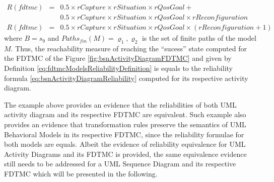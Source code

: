 \begin{equation}
\begin{aligned}
        R(fdtmc) & = & 0.5 \times rCapture \times rSituation \times rQosGoal +\\
                 &   & 0.5 \times rCapture \times rSituation \times rQosGoal
                           \times rReconfiguration\\
        R(fdtmc) & = & 0.5 \times rCapture \times rSituation \times rQosGoal
                           \times (rReconfiguration + 1)
\end{aligned}
\label{eq:bsnFDTMCReliability}
\end{equation}
where $B = {s_9}$ and $Paths_{fin}(M) = {\varrho_1,\varrho_2}$ is the set of
finite paths of the model $M$. Thus, the reachability measure of reaching the
``sucess'' state computed for the FDTMC of the Figure
\ref{fig:bsnActivityDiagramFDTMC} and given by
Definition \ref{eq:fdtmcModelsReliabilityDefinition} is equals to the
reliability formula \ref{eq:bsnActivityDiagramReliability} computed for its
respective activity diagram.

The example above provides an evidence that the reliabilities of both UML
activity diagram and its respective FDTMC are equivalent. 
Such example also provides an evidence that transformation rules preserve the
semantics of UML Behavioral Models in its respective FDTMC, since the
reliability formulae for both models are equals. Albeit the evidence of
reliability equivalence for UML Activity Diagrams and its FDTMC is provided, the
same equivalence evidence still needs to be addressed for a UML Sequence Diagram
and its respective FDTMC which will be presented in the following.

